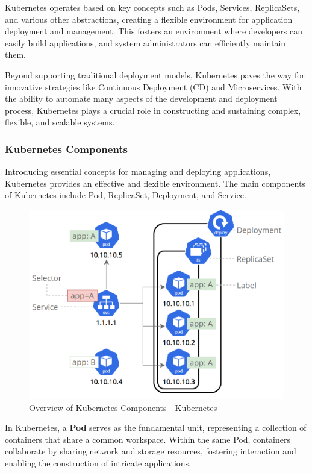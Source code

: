 Kubernetes operates based on key concepts such as Pods, Services, ReplicaSets, and various other abstractions, creating a flexible environment for application deployment and management. This fosters an environment where developers can easily build applications, and system administrators can efficiently maintain them.

Beyond supporting traditional deployment models, Kubernetes paves the way for innovative strategies like Continuous Deployment (CD) and Microservices. With the ability to automate many aspects of the development and deployment process, Kubernetes plays a crucial role in constructing and sustaining complex, flexible, and scalable systems.

\subsubsection{Kubernetes Components}

Introducing essential concepts for managing and deploying applications, Kubernetes provides an effective and flexible environment. The main components of Kubernetes include Pod, ReplicaSet, Deployment, and Service.

\begin{figure}[H]
    \centering
    \includegraphics[width=0.75\linewidth]{Images/3.4-k8s-comps.png}
    \caption{Overview of Kubernetes Components - Kubernetes}
    \label{fig:k8s-comps}
\end{figure}

In Kubernetes, a \textbf{Pod} serves as the fundamental unit, representing a collection of containers that share a common workspace.
Within the same Pod, containers collaborate by sharing network and storage resources, fostering interaction and enabling the construction of intricate applications.

